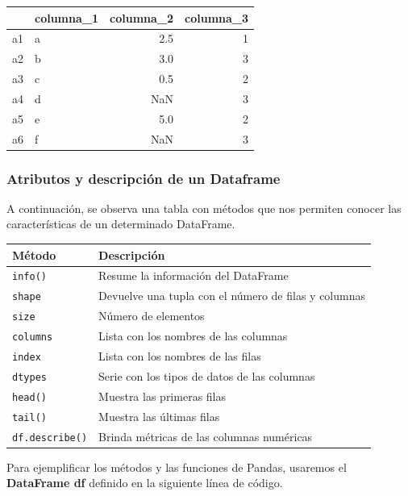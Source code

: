 \documentclass[
  letterpaper,
  DIV=11,
  numbers=noendperiod]{scrreprt}
\begin{document}
\begin{tabular}{llrr}
\toprule
{} & columna\_1 &  columna\_2 &  columna\_3 \\
\midrule
a1 &         a &        2.5 &          1 \\
a2 &         b &        3.0 &          3 \\
a3 &         c &        0.5 &          2 \\
a4 &         d &        NaN &          3 \\
a5 &         e &        5.0 &          2 \\
a6 &         f &        NaN &          3 \\
\bottomrule
\end{tabular}

\subsubsection{Atributos y descripción de un
Dataframe}\label{atributos-y-descripciuxf3n-de-un-dataframe}

A continuación, se observa una tabla con métodos que nos permiten
conocer las características de un determinado DataFrame.

\begin{longtable}[]{@{}ll@{}}
\toprule\noalign{}
Método & Descripción \\
\midrule\noalign{}
\endhead
\bottomrule\noalign{}
\endlastfoot
\texttt{info()} & Resume la información del DataFrame \\
\texttt{shape} & Devuelve una tupla con el número de filas y columnas \\
\texttt{size} & Número de elementos \\
\texttt{columns} & Lista con los nombres de las columnas \\
\texttt{index} & Lista con los nombres de las filas \\
\texttt{dtypes} & Serie con los tipos de datos de las columnas \\
\texttt{head()} & Muestra las primeras filas \\
\texttt{tail()} & Muestra las últimas filas \\
\texttt{df.describe()} & Brinda métricas de las columnas numéricas \\
\end{longtable}

Para ejemplificar los métodos y las funciones de Pandas, usaremos el
\textbf{DataFrame df} definido en la siguiente línea de código.
\end{document}
